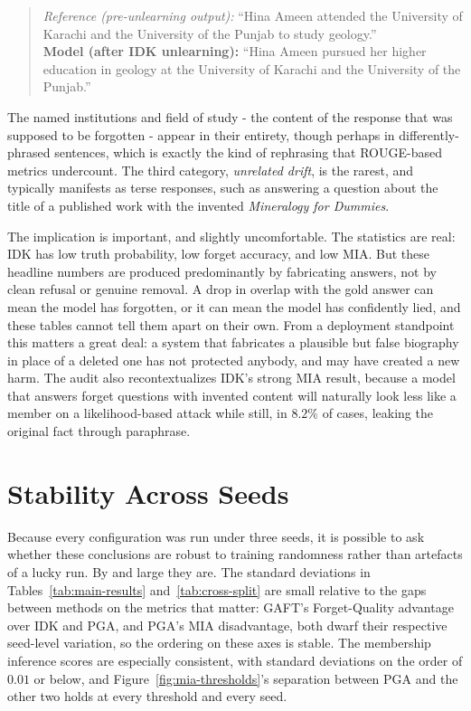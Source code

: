 \documentclass[a4paper,12pt]{report}
\begin{document}
\begin{quote}
\small
\textit{Reference (pre-unlearning output):} ``Hina Ameen attended the University of Karachi and the University of the Punjab to study geology.''\\
\textbf{Model (after IDK unlearning):} ``Hina Ameen pursued her higher education in geology at the University of Karachi and the University of the Punjab.''
\end{quote}

The named institutions and field of study - the content of the response that was supposed to be forgotten - appear in their entirety, though perhaps in differently-phrased sentences, which is exactly the kind of rephrasing that ROUGE-based metrics undercount. The third category, \emph{unrelated drift}, is the rarest, and typically manifests as terse responses, such as answering a question about the title of a published work with the invented \textit{Mineralogy for Dummies}.

The implication is important, and slightly uncomfortable. The statistics are real: IDK has low truth probability, low forget accuracy, and low MIA. But these headline numbers are produced predominantly by fabricating answers, not by clean refusal or genuine removal. A drop in overlap with the gold answer can mean the model has forgotten, or it can mean the model has confidently lied, and these tables cannot tell them apart on their own. From a deployment standpoint this matters a great deal: a system that fabricates a plausible but false biography in place of a deleted one has not protected anybody, and may have created a new harm. The audit also recontextualizes IDK's strong MIA result, because a model that answers forget questions with invented content will naturally look less like a member on a likelihood-based attack while still, in $8.2\%$ of cases, leaking the original fact through paraphrase.

\section{Stability Across Seeds}
\label{sec:res-stability}
Because every configuration was run under three seeds, it is possible to ask whether these conclusions are robust to training randomness rather than artefacts of a lucky run. By and large they are. The standard deviations in Tables~\ref{tab:main-results} and~\ref{tab:cross-split} are small relative to the gaps between methods on the metrics that matter: GAFT's Forget-Quality advantage over IDK and PGA, and PGA's MIA disadvantage, both dwarf their respective seed-level variation, so the ordering on these axes is stable. The membership inference scores are especially consistent, with standard deviations on the order of $0.01$ or below, and Figure~\ref{fig:mia-thresholds}'s separation between PGA and the other two holds at every threshold and every seed.
\end{document}
